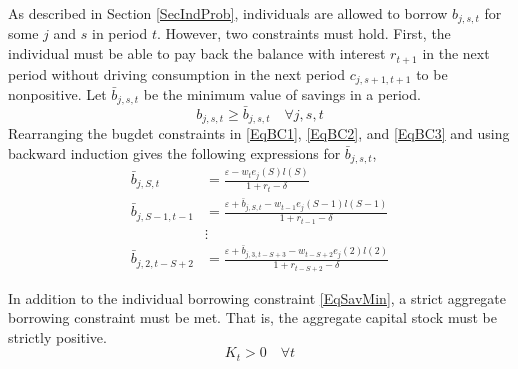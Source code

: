 \documentclass[letterpaper,12pt]{article}
\theoremstyle{definition}
\newcommand\ve{\varepsilon}
\begin{document}
  As described in Section \ref{SecIndProb}, individuals are allowed to borrow $b_{j,s,t}$ for some $j$ and $s$ in period $t$. However, two constraints must hold. First, the individual must be able to pay back the balance with interest $r_{t+1}$ in the next period without driving consumption in the next period $c_{j,s+1,t+1}$ to be nonpositive. Let $\bar{b}_{j,s,t}$ be the minimum value of savings in a period.
  \begin{equation}\label{EqSavMin}
    b_{j,s,t}\geq\bar{b}_{j,s,t} \quad\forall j,s,t
  \end{equation}
  Rearranging the bugdet constraints in \eqref{EqBC1}, \eqref{EqBC2}, and \eqref{EqBC3} and using backward induction gives the following expressions for $\bar{b}_{j,s,t}$,
  \begin{equation}\label{EqBorConsts}
    \begin{split}
      \bar{b}_{j,S,t} &= \frac{\ve - w_te_j(S)l(S)}{1+r_t-\delta}  \\
      \bar{b}_{j,S-1,t-1} &= \frac{\ve + \bar{b}_{j,S,t} - w_{t-1}e_j(S-1)l(S-1)}{1+r_{t-1}-\delta} \\
      &\vdots \\
      \bar{b}_{j,2,t-S+2} &= \frac{\ve + \bar{b}_{j,3,t-S+3} - w_{t-S+2}e_j(2)l(2)}{1+r_{t-S+2}-\delta}
    \end{split}
  \end{equation}

  In addition to the individual borrowing constraint \eqref{EqSavMin}, a strict aggregate borrowing constraint must be met. That is, the aggregate capital stock must be strictly positive.
  \begin{equation}\label{EqAggrCapConstr}
    K_t > 0 \quad\forall t
  \end{equation}




\end{document}
